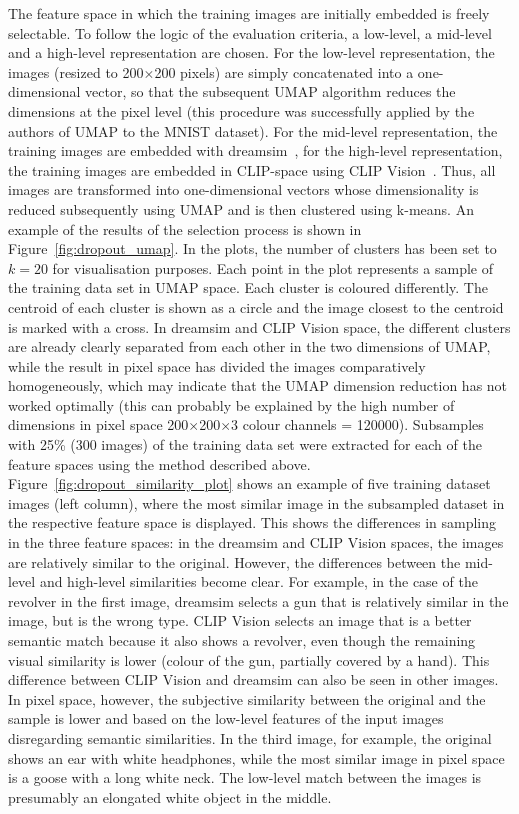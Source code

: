 The feature space in which the training images are initially embedded is freely selectable. To follow the logic of the evaluation criteria, a low-level, a mid-level and a high-level representation are chosen. For the low-level representation, the images (resized to 200$\times$200 pixels) are simply concatenated into a one-dimensional vector, so that the subsequent UMAP algorithm reduces the dimensions at the pixel level (this procedure was successfully applied by the authors of UMAP to the MNIST dataset). For the mid-level representation, the training images are embedded with dreamsim~\cite{fuDreamSimLearningNew2023}, for the high-level representation, the training images are embedded in CLIP-space using CLIP Vision~\cite{radfordLearningTransferableVisual2021}. Thus, all images are transformed into one-dimensional vectors whose dimensionality is reduced subsequently using UMAP and is then clustered using k-means. 
An example of the results of the selection process is shown in Figure~\ref{fig:dropout_umap}. In the plots, the number of clusters has been set to $k=20$ for visualisation purposes. Each point in the plot represents a sample of the training data set in UMAP space. Each cluster is coloured differently. The centroid of each cluster is shown as a circle and the image closest to the centroid is marked with a cross. In dreamsim and CLIP Vision space, the different clusters are already clearly separated from each other in the two dimensions of UMAP, while the result in pixel space has divided the images comparatively homogeneously, which may indicate that the UMAP dimension reduction has not worked optimally (this can probably be explained by the high number of dimensions in pixel space 200$\times$200$\times$3 colour channels = 120000). 
Subsamples with 25\% (300 images) of the training data set were extracted for each of the feature spaces using the method described above. Figure~\ref{fig:dropout_similarity_plot} shows an example of five training dataset  images (left column), where the most similar image in the subsampled dataset in the respective feature space is displayed. This shows the differences in sampling in the three feature spaces: in the dreamsim and CLIP Vision spaces, the images are relatively similar to the original. However, the differences between the mid-level and high-level similarities become clear. For example, in the case of the revolver in the first image, dreamsim selects a gun that is relatively similar in the image, but is the wrong type. CLIP Vision selects an image that is a better semantic match because it also shows a revolver, even though the remaining visual similarity is lower (colour of the gun, partially covered by a hand). This difference between CLIP Vision and dreamsim can also be seen in other images. In pixel space, however, the subjective similarity between the original and the sample is lower and based on the low-level features of the input images disregarding semantic similarities. In the third image, for example, the original shows an ear with white headphones, while the most similar image in pixel space is a goose with a long white neck. The low-level match between the images is presumably an elongated white object in the middle. 

